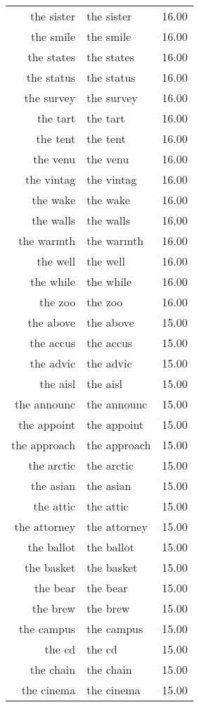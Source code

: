 \begin{table}[ht]
\begin{tabular}{rlr}
  the sister & the sister & 16.00 \\ 
  the smile & the smile & 16.00 \\ 
  the states & the states & 16.00 \\ 
  the status & the status & 16.00 \\ 
  the survey & the survey & 16.00 \\ 
  the tart & the tart & 16.00 \\ 
  the tent & the tent & 16.00 \\ 
  the venu & the venu & 16.00 \\ 
  the vintag & the vintag & 16.00 \\ 
  the wake & the wake & 16.00 \\ 
  the walls & the walls & 16.00 \\ 
  the warmth & the warmth & 16.00 \\ 
  the well & the well & 16.00 \\ 
  the while & the while & 16.00 \\ 
  the zoo & the zoo & 16.00 \\ 
  the above & the above & 15.00 \\ 
  the accus & the accus & 15.00 \\ 
  the advic & the advic & 15.00 \\ 
  the aisl & the aisl & 15.00 \\ 
  the announc & the announc & 15.00 \\ 
  the appoint & the appoint & 15.00 \\ 
  the approach & the approach & 15.00 \\ 
  the arctic & the arctic & 15.00 \\ 
  the asian & the asian & 15.00 \\ 
  the attic & the attic & 15.00 \\ 
  the attorney & the attorney & 15.00 \\ 
  the ballot & the ballot & 15.00 \\ 
  the basket & the basket & 15.00 \\ 
  the bear & the bear & 15.00 \\ 
  the brew & the brew & 15.00 \\ 
  the campus & the campus & 15.00 \\ 
  the cd & the cd & 15.00 \\ 
  the chain & the chain & 15.00 \\ 
  the cinema & the cinema & 15.00 \\ 

\end{tabular}
\end{table}

